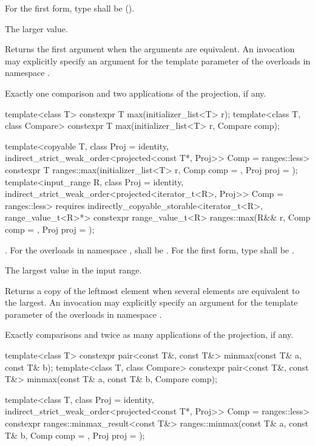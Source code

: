 \begin{itemdescr}
\pnum
\requires
For the first form, type  shall be
 ().

\pnum
\returns
The larger value.

\pnum
\remarks
Returns the first argument when the arguments are equivalent.
An invocation may explicitly specify
an argument for the template parameter 
of the overloads in namespace .

\pnum
\complexity
Exactly one comparison and two applications of the projection, if any.
\end{itemdescr}

%
\begin{itemdecl}
template<class T>
  constexpr T max(initializer_list<T> r);
template<class T, class Compare>
  constexpr T max(initializer_list<T> r, Compare comp);

template<copyable T, class Proj = identity,
         indirect_strict_weak_order<projected<const T*, Proj>> Comp = ranges::less>
  constexpr T ranges::max(initializer_list<T> r, Comp comp = {}, Proj proj = {});
template<input_range R, class Proj = identity,
         indirect_strict_weak_order<projected<iterator_t<R>, Proj>> Comp = ranges::less>
  requires indirectly_copyable_storable<iterator_t<R>, range_value_t<R>*>
  constexpr range_value_t<R>
    ranges::max(R&& r, Comp comp = {}, Proj proj = {});
\end{itemdecl}

\begin{itemdescr}
\pnum
\requires
{}.
For the overloads in namespace ,
 shall be .
For the first form, type  shall be .

\pnum
\returns
The largest value in the input range.

\pnum
\remarks
Returns a copy of the leftmost element
when several elements are equivalent to the largest.
An invocation may explicitly specify
an argument for the template parameter 
of the overloads in namespace .

\pnum
\complexity
Exactly  comparisons
and twice as many applications of the projection, if any.
\end{itemdescr}

%
\begin{itemdecl}
template<class T>
  constexpr pair<const T&, const T&> minmax(const T& a, const T& b);
template<class T, class Compare>
  constexpr pair<const T&, const T&> minmax(const T& a, const T& b, Compare comp);

template<class T, class Proj = identity,
         indirect_strict_weak_order<projected<const T*, Proj>> Comp = ranges::less>
  constexpr ranges::minmax_result<const T&>
    ranges::minmax(const T& a, const T& b, Comp comp = {}, Proj proj = {});
\end{itemdecl}


